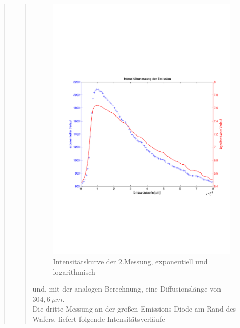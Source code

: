 \begin{quote}
\begin{quote}
        \begin{figure}[H]
                    \centering
                        \includegraphics[scale=0.53, trim = 1cm 6cm 1.5cm 8cm,
                        clip]{./Emissionsbilder/zwei/Intensitatsmessung.pdf}
                        \caption{Intensitätskurve der 2.Messung, exponentiell
                        und logarithmisch}
                            \label{fig:./Emissionsbilder/zwei/Intensitatsmessung.pdf}
        \end{figure}

        und, mit der analogen Berechnung, eine Diffusionslänge von $304,6\ \mu
        m$.\\

        Die dritte Messung an der großen Emissions-Diode am Rand des Wafers,
        liefert folgende Intensitätsverläufe


\end{quote}
\end{quote}
